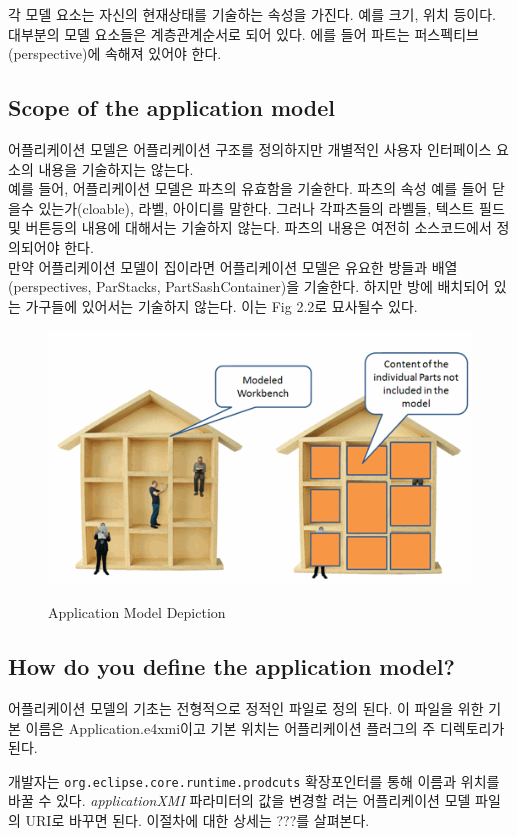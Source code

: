 각 모델 요소는 자신의 현재상태를 기술하는 속성을 가진다. 예를 크기, 위치 등이다. 대부분의 모델 요소들은 계층관계순서로 되어 있다. 에를 들어 파트는 퍼스펙티브(perspective)에 속해져 있어야 한다. \\ 

\subsection{Scope of the application model}
어플리케이션 모델은 어플리케이션 구조를 정의하지만 개별적인 사용자 인터페이스 요소의 내용을 기술하지는 않는다. \\

예를 들어, 어플리케이션 모델은 파츠의 유효함을 기술한다. 파츠의 속성 예를 들어 닫을수 있는가(cloable), 라벨, 아이디를 말한다. 그러나 각파츠들의 라벨들, 텍스트 필드및 버튼등의 내용에 대해서는 기술하지 않는다. 파츠의 내용은 여전히 소스코드에서 정의되어야 한다. \\

만약 어플리케이션 모델이 집이라면 어플리케이션 모델은 유요한 방들과 배열(perspectives, ParStacks, PartSashContainer)을 기술한다. 하지만 방에 배치되어 있는 가구들에 있어서는 기술하지 않는다. 이는 Fig 2.2로 묘사될수 있다. \\

\begin{figure}[hbt]
\centering
\includegraphics[scale=.50]{./image/e4_002}
\label{fig:2}       %
\captionsetup{justification=centering}
\caption{Application Model Depiction}
\end{figure}

\subsection{How do you define the application model?}
어플리케이션 모델의 기초는 전형적으로 정적인 파일로 정의 된다. 이 파일을 위한 기본 이름은 Application.e4xmi이고 기본 위치는 어플리케이션 플러그의 주 디렉토리가 된다. \\
\begin{svgraybox}
개발자는 \verb|org.eclipse.core.runtime.prodcuts| 확장포인터를 통해 이름과 위치를 바꿀 수 있다. \textit{applicationXMI} 파라미터의 값을 변경할 려는 어플리케이션 모델 파일의 URI로 바꾸면 된다. 이절차에 대한 상세는 ???를 살펴본다.
\end{svgraybox}


